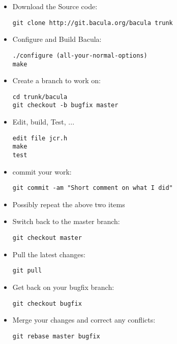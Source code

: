 \begin{itemize}
\item Download the Source code:\\
\begin{verbatim}
git clone http://git.bacula.org/bacula trunk
\end{verbatim}

\item Configure and Build Bacula:\\
\begin{verbatim}
./configure (all-your-normal-options)
make
\end{verbatim}

\item Create a branch to work on:
\begin{verbatim}
cd trunk/bacula
git checkout -b bugfix master
\end{verbatim}

\item Edit, build, Test, ...\\
\begin{verbatim}
edit file jcr.h
make
test
\end{verbatim}

\item commit your work:
\begin{verbatim}
git commit -am "Short comment on what I did"
\end{verbatim}

\item Possibly repeat the above two items

\item Switch back to the master branch:\\
\begin{verbatim}
git checkout master
\end{verbatim}

\item Pull the latest changes:\\
\begin{verbatim}
git pull
\end{verbatim}

\item Get back on your bugfix branch:\\
\begin{verbatim}
git checkout bugfix
\end{verbatim}

\item Merge your changes and correct any conflicts:\\
\begin{verbatim}
git rebase master bugfix
\end{verbatim}


\end{itemize}
